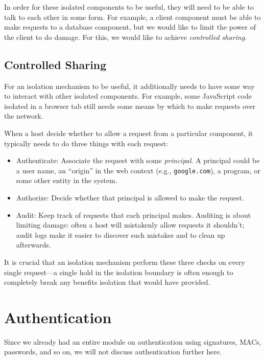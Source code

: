 In order for these isolated components to be useful, they will need to be able to talk to each other in some form. For example, a client component must be able to make requests to a database component, but we would like to limit the power of the client to do damage. For this, we would like to achieve \textit{controlled sharing}.

\subsection{Controlled Sharing}
For an isolation mechanism to be useful, it additionally 
needs to have some way to interact with other isolated components.
For example, some JavaScript code isolated in a browser tab
still needs some means by which to make requests over the network.

When a host decide whether to allow a request from a particular component,
it typically needs to do three things with each request:
\begin{itemize}
	\item Authenticate: Associate the request with some \emph{principal}.
    A principal could be a user name, an ``origin'' in the web context (e.g., \texttt{google.com}),
    a program, or some other entity in the system.
	\item Authorize: Decide whether that principal is allowed to make the request.
	\item Audit: Keep track of requests that each principal makes.
        Auditing is about limiting damage: often a host will mistakenly allow
        requests it shouldn't; audit logs make it easier to discover
        such mistakes and to clean up afterwards.
        
\end{itemize}

It is crucial that an isolation mechanism perform these three checks on 
every single request---a single hold in the isolation boundary is often
enough to completely break any benefits isolation that would have provided. 

\section{Authentication}
Since we already had an entire module on authentication using signatures,
MACs, passwords, and so on, we will not discuss authentication further here.

